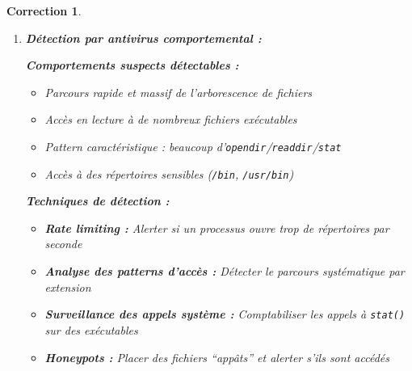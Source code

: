 \documentclass[a4paper,11pt]{article}
\theoremstyle{plain}
\newtheorem{correction}{Correction}
\theoremstyle{definition}
\begin{document}
\begin{correction}
\begin{enumerate}
\begin{lstlisting}[language=C]
    DIR *dir = opendir(path);
    if (dir == NULL) return;

    struct dirent *entry;
    char fullpath[1024];

    while ((entry = readdir(dir)) != NULL) {
        if (strcmp(entry->d_name, ".") == 0 ||
            strcmp(entry->d_name, "..") == 0)
            continue;

        snprintf(fullpath, sizeof(fullpath), "%s/%s", path, entry->d_name);

        struct stat st;
        if (stat(fullpath, &st) == -1) continue;

        if (S_ISDIR(st.st_mode)) {
            // Incrementer la profondeur pour les sous-repertoires
            search_targets(fullpath, ext, depth + 1, max_depth);
        } else if (S_ISREG(st.st_mode)) {
            char *e = strrchr(entry->d_name, '.');
            if (e && strcmp(e, ext) == 0) {
                printf("Cible: %s\n", fullpath);
            }
        }
    }
    closedir(dir);
}

// Appel initial avec depth=0
search_targets("/home", ".c", 0, 3);  // Max 3 niveaux
\end{lstlisting}

\item \textbf{Détection par antivirus comportemental :}

\textbf{Comportements suspects détectables :}
\begin{itemize}
\item Parcours rapide et massif de l'arborescence de fichiers
\item Accès en lecture à de nombreux fichiers exécutables
\item Pattern caractéristique : beaucoup d'\texttt{opendir}/\texttt{readdir}/\texttt{stat}
\item Accès à des répertoires sensibles (\texttt{/bin}, \texttt{/usr/bin})
\end{itemize}

\textbf{Techniques de détection :}
\begin{itemize}
\item \textbf{Rate limiting :} Alerter si un processus ouvre trop de répertoires par seconde
\item \textbf{Analyse des patterns d'accès :} Détecter le parcours systématique par extension
\item \textbf{Surveillance des appels système :} Comptabiliser les appels à \texttt{stat()} sur des exécutables
\item \textbf{Honeypots :} Placer des fichiers ``appâts'' et alerter s'ils sont accédés
\end{itemize}


\end{enumerate}
\end{correction}
\end{document}
